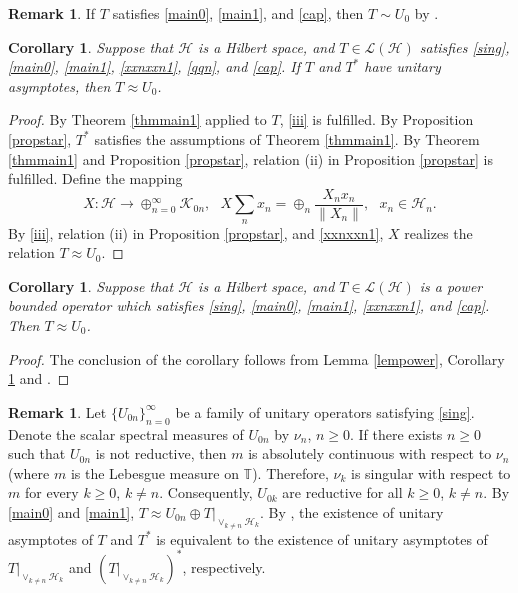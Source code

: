 \documentclass[a4paper,oneside,11pt]{amsart}
\numberwithin{equation}{section}
\theoremstyle{plain}
\newtheorem{corollary}[theorem]{Corollary}
\theoremstyle{definition}
\newtheorem{remark}[theorem]{Remark}
\begin{document}
\begin{remark}\label{remapostol} If $T$ satisfies \eqref{main0}, \eqref{main1}, and \eqref{cap}, then $T\sim U_0$ by  \cite{apostol}. 
\end{remark}

\begin{corollary}\label{cor110} 
Suppose that $\mathcal H$ is a Hilbert space,  and 
  $T\in  \mathcal L(\mathcal H)$ satisfies   \eqref{sing}, \eqref{main0},  \eqref{main1},    \eqref{xxnxxn1}, \eqref{qqn}, and  \eqref{cap}.
If  $T$ and $T^*$ have unitary asymptotes, then $T\approx U_0$. 
\end{corollary}
\begin{proof} By Theorem \ref{thmmain1} applied to $T$, \eqref{iii} is fulfilled. By Proposition \ref{propstar}, $T^*$ 
satisfies the assumptions  of  Theorem \ref{thmmain1}. By Theorem \ref{thmmain1} and  Proposition \ref{propstar}, 
 relation (ii) in Proposition \ref{propstar}  is fulfilled. Define the mapping
$$X\colon\mathcal H\to\oplus_{n=0}^\infty \mathcal K_{0n}, \ \ \ X\sum_n x_n =\oplus_n\frac{X_n x_n}{\|X_n\|}, \ \ \ x_n\in\mathcal H_n.$$
By   \eqref{iii}, relation (ii) in Proposition \ref{propstar}, and \eqref{xxnxxn1}, $X$ realizes the relation  $T\approx U_0$. 
\end{proof}

\begin{corollary}\label{corpower} 
Suppose that $\mathcal H$ is a Hilbert space,  and 
  $T\in  \mathcal L(\mathcal H)$ is a power bounded operator which  satisfies   \eqref{sing}, \eqref{main0},  \eqref{main1},    \eqref{xxnxxn1},  and  \eqref{cap}.
Then $T\approx U_0$. 
\end{corollary}
\begin{proof} The conclusion of the
 corollary follows from Lemma \ref{lempower}, Corollary \ref{cor110} and \cite{ker89}.  
\end{proof}

\begin{remark} Let $\{U_{0n}\}_{n=0}^\infty$ be a  family of unitary operators  satisfying  \eqref{sing}. 
Denote the scalar spectral measures of $U_{0n}$ by $\nu_n$, $n\geq 0$.  
 If there exists $n\geq 0$ such that  $U_{0n}$ is not reductive, then $m$ is absolutely continuous with respect to $\nu_n$ 
 (where $m$ is the Lebesgue measure on $\mathbb T$). Therefore,  $\nu_k$ is singular with respect to $m$ for every $k\geq 0$,  $k\neq n$.   Consequently, $U_{0k}$ are reductive for all $k\geq 0$,  $k\neq n$. By \eqref{main0} and \eqref{main1}, 
$T\approx U_{0n}\oplus T|_{\vee_{k\neq n}\mathcal H_k}$. By  {\cite[Proposition 13]{kerntuple}}, the existence of unitary asymptotes of $T$ and $T^*$ is equivalent to  the existence of unitary asymptotes of 
$T|_{\vee_{k\neq n}\mathcal H_k}$ and $(T|_{\vee_{k\neq n}\mathcal H_k})^*$, respectively.
\end{remark}
\end{document}
